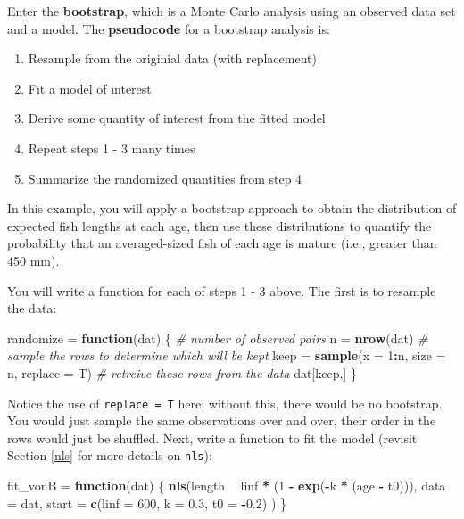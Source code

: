\documentclass[]{book}
\newenvironment{Shaded}{\begin{snugshade}}{\end{snugshade}}
\newcommand{\KeywordTok}[1]{\textcolor[rgb]{0.13,0.29,0.53}{\textbf{#1}}}
\newcommand{\DataTypeTok}[1]{\textcolor[rgb]{0.13,0.29,0.53}{#1}}
\newcommand{\DecValTok}[1]{\textcolor[rgb]{0.00,0.00,0.81}{#1}}
\newcommand{\FloatTok}[1]{\textcolor[rgb]{0.00,0.00,0.81}{#1}}
\newcommand{\StringTok}[1]{\textcolor[rgb]{0.31,0.60,0.02}{#1}}
\newcommand{\CommentTok}[1]{\textcolor[rgb]{0.56,0.35,0.01}{\textit{#1}}}
\newcommand{\ControlFlowTok}[1]{\textcolor[rgb]{0.13,0.29,0.53}{\textbf{#1}}}
\newcommand{\OperatorTok}[1]{\textcolor[rgb]{0.81,0.36,0.00}{\textbf{#1}}}
\newcommand{\NormalTok}[1]{#1}
\providecommand{\tightlist}{%
  \setlength{\itemsep}{0pt}\setlength{\parskip}{0pt}}
\theoremstyle{definition}
\theoremstyle{definition}
\theoremstyle{definition}
\theoremstyle{remark}
\begin{document}
Enter the \textbf{bootstrap}, which is a Monte Carlo analysis using an
observed data set and a model. The \textbf{pseudocode} for a bootstrap
analysis is:

\begin{enumerate}
\def\labelenumi{\arabic{enumi}.}
\tightlist
\item
  Resample from the originial data (with replacement)
\item
  Fit a model of interest
\item
  Derive some quantity of interest from the fitted model
\item
  Repeat steps 1 - 3 many times
\item
  Summarize the randomized quantities from step 4
\end{enumerate}

In this example, you will apply a bootstrap approach to obtain the
distribution of expected fish lengths at each age, then use these
distributions to quantify the probability that an averaged-sized fish of
each age is mature (i.e., greater than 450 mm).

You will write a function for each of steps 1 - 3 above. The first is to
resample the data:

\begin{Shaded}
\begin{Highlighting}[]
\NormalTok{randomize =}\StringTok{ }\ControlFlowTok{function}\NormalTok{(dat) \{}
  \CommentTok{# number of observed pairs}
\NormalTok{  n =}\StringTok{ }\KeywordTok{nrow}\NormalTok{(dat)}
  \CommentTok{# sample the rows to determine which will be kept}
\NormalTok{  keep =}\StringTok{ }\KeywordTok{sample}\NormalTok{(}\DataTypeTok{x =} \DecValTok{1}\OperatorTok{:}\NormalTok{n, }\DataTypeTok{size =}\NormalTok{ n, }\DataTypeTok{replace =}\NormalTok{ T)}
  \CommentTok{# retreive these rows from the data}
\NormalTok{  dat[keep,]}
\NormalTok{\}}
\end{Highlighting}
\end{Shaded}

Notice the use of \texttt{replace\ =\ T} here: without this, there would
be no bootstrap. You would just sample the same observations over and
over, their order in the rows would just be shuffled. Next, write a
function to fit the model (revisit Section \ref{nls} for more details on
\texttt{nls}):

\begin{Shaded}
\begin{Highlighting}[]
\NormalTok{fit_vonB =}\StringTok{ }\ControlFlowTok{function}\NormalTok{(dat) \{}
  \KeywordTok{nls}\NormalTok{(length }\OperatorTok{~}\StringTok{ }\NormalTok{linf }\OperatorTok{*}\StringTok{ }\NormalTok{(}\DecValTok{1} \OperatorTok{-}\StringTok{ }\KeywordTok{exp}\NormalTok{(}\OperatorTok{-}\NormalTok{k }\OperatorTok{*}\StringTok{ }\NormalTok{(age }\OperatorTok{-}\StringTok{ }\NormalTok{t0))),}
      \DataTypeTok{data =}\NormalTok{ dat,}
      \DataTypeTok{start =} \KeywordTok{c}\NormalTok{(}\DataTypeTok{linf =} \DecValTok{600}\NormalTok{, }\DataTypeTok{k =} \FloatTok{0.3}\NormalTok{, }\DataTypeTok{t0 =} \OperatorTok{-}\FloatTok{0.2}\NormalTok{)}
\NormalTok{      )}
\NormalTok{\}}
\end{Highlighting}
\end{Shaded}
\end{document}
